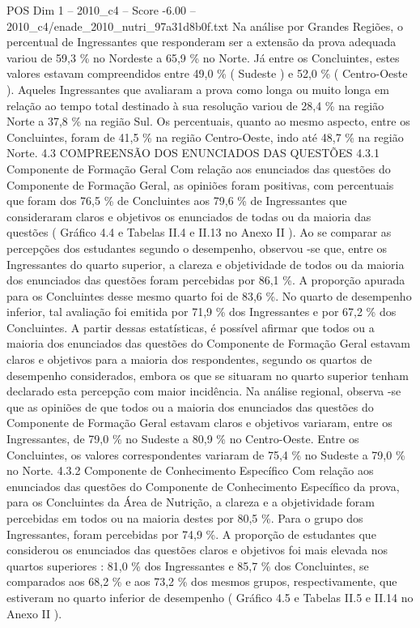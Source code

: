 \begin{textsample}{POS Dim 1 – 2010\_c4 – Score -6.00 – 2010\_c4/enade\_2010\_nutri\_97a31d8b0f.txt}
Na análise por Grandes Regiões, o percentual de Ingressantes que responderam ser a extensão da prova adequada variou de 59,3 \% no Nordeste a 65,9 \% no Norte.
Já entre os Concluintes, estes valores estavam compreendidos entre 49,0 \% ( Sudeste ) e 52,0 \% ( Centro-Oeste ).
Aqueles Ingressantes que avaliaram a prova como longa ou muito longa em relação ao tempo total destinado à sua resolução variou de 28,4 \% na região Norte a 37,8 \% na região Sul.
Os percentuais, quanto ao mesmo aspecto, entre os Concluintes, foram de 41,5 \% na região Centro-Oeste, indo até 48,7 \% na região Norte. 4.3 COMPREENSÃO DOS ENUNCIADOS DAS QUESTÕES 4.3.1 Componente de Formação Geral Com relação aos enunciados das questões do Componente de Formação Geral, as opiniões foram positivas, com percentuais que foram dos 76,5 \% de Concluintes aos 79,6 \% de Ingressantes que consideraram claros e objetivos os enunciados de todas ou da maioria das questões ( Gráfico 4.4 e Tabelas II.4 e II.13 no Anexo II ).
Ao se comparar as percepções dos estudantes segundo o desempenho, observou -se que, entre os Ingressantes do quarto superior, a clareza e objetividade de todos ou da maioria dos enunciados das questões foram percebidas por 86,1 \%.
A proporção apurada para os Concluintes desse mesmo quarto foi de 83,6 \%.
No quarto de desempenho inferior, tal avaliação foi emitida por 71,9 \% dos Ingressantes e por 67,2 \% dos Concluintes.
A partir dessas estatísticas, é possível afirmar que todos ou a maioria dos enunciados das questões do Componente de Formação Geral estavam claros e objetivos para a maioria dos respondentes, segundo os quartos de desempenho considerados, embora os que se situaram no quarto superior tenham declarado esta percepção com maior incidência.
Na análise regional, observa -se que as opiniões de que todos ou a maioria dos enunciados das questões do Componente de Formação Geral estavam claros e objetivos variaram, entre os Ingressantes, de 79,0 \% no Sudeste a 80,9 \% no Centro-Oeste.
Entre os Concluintes, os valores correspondentes variaram de 75,4 \% no Sudeste a 79,0 \% no Norte. 4.3.2 Componente de Conhecimento Específico Com relação aos enunciados das questões do Componente de Conhecimento Específico da prova, para os Concluintes da Área de Nutrição, a clareza e a objetividade foram percebidas em todos ou na maioria destes por 80,5 \%.
Para o grupo dos Ingressantes, foram percebidas por 74,9 \%.
A proporção de estudantes que considerou os enunciados das questões claros e objetivos foi mais elevada nos quartos superiores : 81,0 \% dos Ingressantes e 85,7 \% dos Concluintes, se comparados aos 68,2 \% e aos 73,2 \% dos mesmos grupos, respectivamente, que estiveram no quarto inferior de desempenho ( Gráfico 4.5 e Tabelas II.5 e II.14 no Anexo II ).

\end{textsample}
